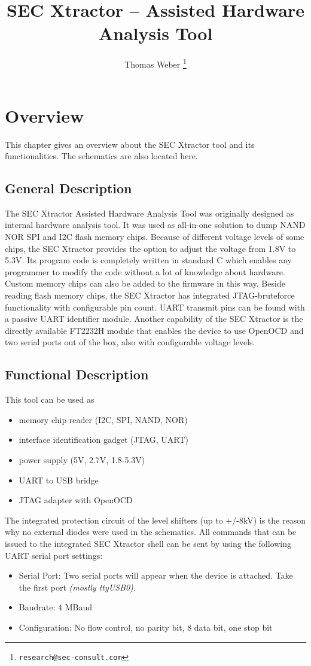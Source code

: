 \documentclass[a4paper]{report}
\title{SEC Xtractor -- Assisted Hardware Analysis Tool}
\author{Thomas Weber
  \thanks{\texttt{research@sec-consult.com}}}
\affil{SEC Consult Unternehmensberatung GmbH\footnote{\texttt{\url{https://www.sec-consult.com}}},\\ SEC Consult Vulnerability Lab,\\ Leopold-Ungar-Platz 2/3/3, 1190, Vienna\\Responsible: T. Weber, Classification: Public}
\begin{document}
\maketitle
\chapter{Overview}
This chapter gives an overview about the SEC Xtractor tool and its functionalities.
The schematics are also located here.
\section{General Description}
The SEC Xtractor Assisted Hardware Analysis Tool was originally designed as internal hardware analysis tool. 
It was used as all-in-one solution to dump NAND \/ NOR \/ SPI and I2C flash memory chips. 
Because of different voltage levels of some chips, the SEC Xtractor provides the option to adjust the voltage from 1.8V to 5.3V. 
Its program code is completely written in standard C which enables any programmer to modify the code without a lot of knowledge about hardware. 
Custom memory chips can also be added to the firmware in this way.
Beside reading flash memory chips, the SEC Xtractor has integrated JTAG-bruteforce functionality with configurable pin count. 
UART transmit pins can be found with a passive UART identifier module.
Another capability of the SEC Xtractor is the directly available FT2232H module that enables the device to use OpenOCD and two serial ports out of the box, also with configurable voltage levels.
\section{Functional Description}
This tool can be used as
\begin{itemize}
 \item memory chip reader (I2C, SPI, NAND, NOR)
 \item interface identification gadget (JTAG, UART)
 \item power supply (5V, 2.7V, 1.8-5.3V)
 \item UART to USB bridge
 \item JTAG adapter with OpenOCD
\end{itemize}

The integrated protection circuit of the level shifters (up to +/-8kV) is the reason why no external diodes were used in the schematics.
All commands that can be issued to the integrated SEC Xtractor shell can be sent by using the following UART serial port settings:
\begin{itemize}
 \item Serial Port: Two serial ports will appear when the device is attached. Take the first port \textit{(mostly ttyUSB0)}.
 \item Baudrate: 4 MBaud
 \item Configuration: No flow control, no parity bit, 8 data bit, one stop bit
\end{itemize}
\end{document}
